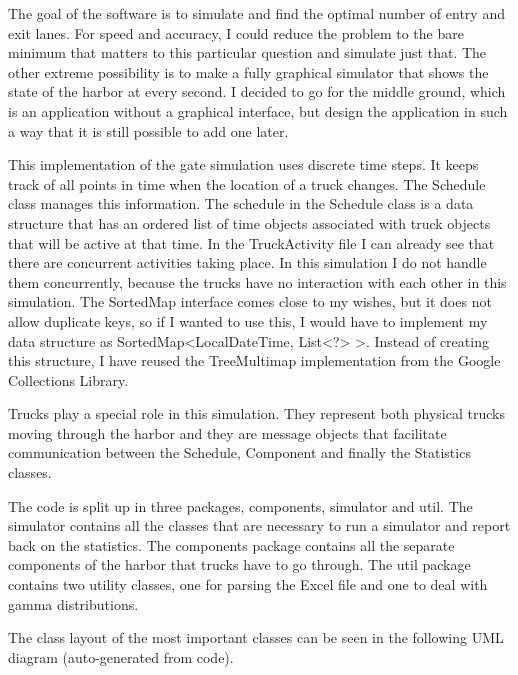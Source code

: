\documentclass{article}
\begin{document}
The goal of the software is to simulate and find the optimal number of
entry and exit lanes. For speed and accuracy, I could reduce the
problem to the bare minimum that matters to this particular question
and simulate just that. The other extreme possibility is to make a
fully graphical simulator that shows the state of the harbor at every
second. I decided to go for the middle ground, which is an application
without a graphical interface, but design the application in such a
way that it is still possible to add one later.

This implementation of the gate simulation uses discrete time
steps. It keeps track of all points in time when the location of a
truck changes. The Schedule class manages this information. The
schedule in the Schedule class is a data structure that has an ordered
list of time objects associated with truck objects that will be active
at that time. In the TruckActivity file I can already see that there
are concurrent activities taking place. In this simulation I do not
handle them concurrently, because the trucks have no interaction with
each other in this simulation. The SortedMap interface comes close to
my wishes, but it does not allow duplicate keys, so if I wanted to use
this, I would have to implement my data structure as
SortedMap\textless LocalDateTime, List\textless ?\textgreater
\textgreater. Instead of creating this structure, I have reused the
TreeMultimap implementation from the Google Collections Library.

Trucks play a special role in this simulation. They represent both
physical trucks moving through the harbor and they are message objects
that facilitate communication between the Schedule, Component and
finally the Statistics classes.

The code is split up in three packages, components, simulator and
util. The simulator contains all the classes that are necessary to run
a simulator and report back on the statistics. The components package
contains all the separate components of the harbor that trucks have to
go through. The util package contains two utility classes, one for
parsing the Excel file and one to deal with gamma distributions.

\pagebreak
The class layout of the most important classes can be seen in the
following UML diagram (auto-generated from code).
\end{document}

